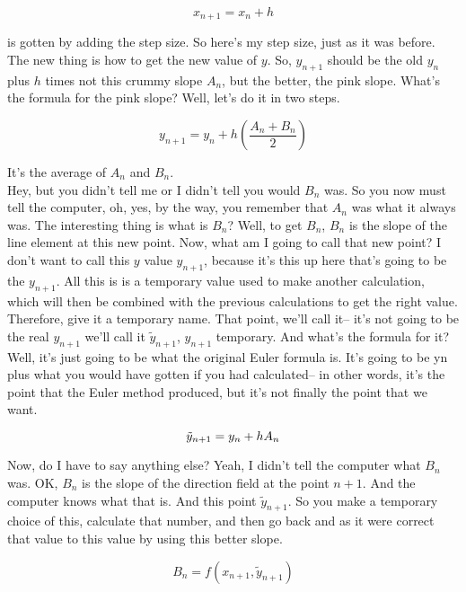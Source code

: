 \begin{equation*}
  x_{n+1} = x_n + h
\end{equation*}

is gotten by adding the step size.
So here's my step size, just as it was before.
The new thing is how to get the new value of $y$.
So, $y_{n+1}$ should be the old $y_n$ plus  $h$ times not this crummy slope $A_n$,
but the better, the pink slope.
What's the formula for the pink slope?
Well, let's do it in two steps.

\begin{equation*}
  y_{n+1} = y_n + h \left( \frac{A_n + B_n}{2} \right) 
\end{equation*}

It's the average of $A_n$ and $B_n$. \\
Hey, but you didn't tell me or I didn't tell you would $B_n$ was.
So you now must tell the computer, oh, yes, by the way,
you remember that $A_n$ was what it always was.
The interesting thing is what is $B_n$?
Well, to get $B_n$, $B_n$ is the slope of the line element at this new point.
Now, what am I going to call that new point?
I don't want to call this $y$ value $y_{n+1}$,
because it's this up here that's going to be the $y_{n+1}$.
All this is is a temporary value used to make another calculation, which will then
be combined with the previous calculations to get the right value.
Therefore, give it a temporary name.
That point, we'll call it-- it's not going to be the real $y_{n+1}$
we'll call it $\tilde{y}_{n+1}$, $y_{n+1}$ temporary.
And what's the formula for it?
Well, it's just going to be what the original Euler formula is.
It's going to be yn plus what you would have gotten
if you had calculated--
in other words, it's the point that the Euler method produced,
but it's not finally the point that we want.

\begin{equation*}
  \tilde{y}_{n+1} = y_n + h A_n \\
\end{equation*}

Now, do I have to say anything else?
Yeah, I didn't tell the computer what $B_n$ was.
OK, $B_n$ is the slope of the direction
field at the point $n + 1$.
And the computer knows what that is.
And this point $\tilde{y}_{n+1}$.
So you make a temporary choice of this, calculate that number,
and then go back and as it were correct that value
to this value by using this better slope.

\begin{equation*}
  B_n = f \left(x_{n+1}, \tilde{y}_{n+1} \right)
\end{equation*}

